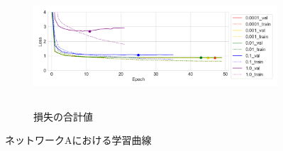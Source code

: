 \begin{figure}[bt]
\begin{subfigure}{\linewidth}
        \centering
        \includegraphics[height=45mm]{./figure/sec4/learning_curves/1/total_loss.png}
        \caption{損失の合計値}
        \label{sec4:fig:learning_curve_method_1_val_total_loss}
    \end{subfigure}
    \caption{ネットワークAにおける学習曲線}
    \label{sec4:fig:learning_curve_method_1_val_losses}
\end{figure}

